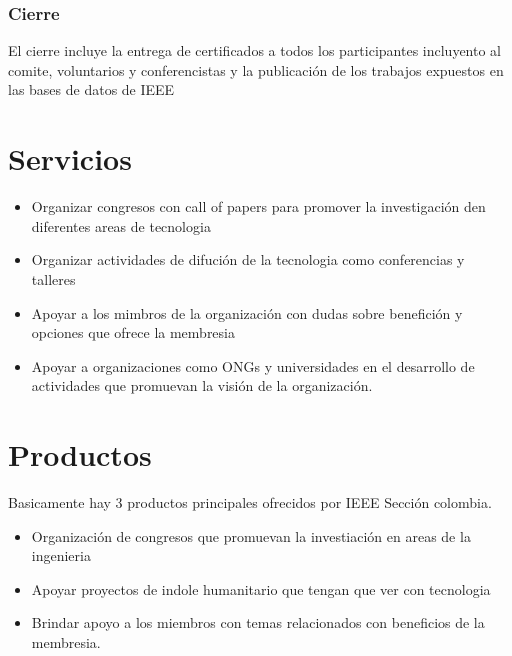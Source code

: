 \subsubsection{Cierre}
El cierre incluye la entrega de certificados a todos los participantes incluyento al comite, voluntarios y conferencistas y la publicación de los trabajos expuestos en las bases de datos de IEEE

\newpage
\section{Servicios}
\begin{itemize}
	\item Organizar congresos con call of papers para promover la investigación den diferentes areas de tecnologia
	\item Organizar actividades de difución de la tecnologia como conferencias y talleres
	\item Apoyar a los mimbros de la organización con dudas sobre benefición y opciones que ofrece la membresia
	\item Apoyar a organizaciones como ONGs y universidades en el desarrollo de actividades que promuevan la visión de la organización.
\end{itemize}
\newpage
\section{Productos}
Basicamente hay 3 productos principales ofrecidos por IEEE Sección colombia.
\begin{itemize}
	\item Organización de congresos que promuevan la investiación en areas de la ingenieria
	\item Apoyar proyectos de indole humanitario que tengan que ver con tecnologia
	\item Brindar apoyo a los miembros con temas relacionados con beneficios de la membresia.
\end{itemize}
\newpage